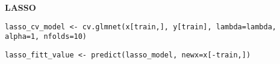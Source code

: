 \textbf{LASSO}

\begin{center}
\texttt{lasso\_cv\_model <- cv.glmnet(x[train,], y[train], lambda=lambda, alpha=1, nfolds=10)}


\texttt{lasso\_fitt\_value <- predict(lasso\_model, newx=x[-train,])}
\end{center}